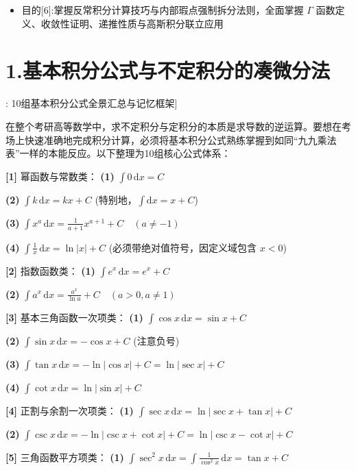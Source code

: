 \documentclass[11pt,a4paper,UTF8]{ctexart}
\begin{document}
\begin{targetbox}[本章复习目标与核心知识图谱]
\begin{itemize}
  \item 目的[6]:掌握反常积分计算技巧与内部瑕点强制拆分法则，全面掌握 $\Gamma$ 函数定义、收敛性证明、递推性质与高斯积分联立应用
\end{itemize}
\end{targetbox}


\section{1.基本积分公式与不定积分的凑微分法}

\begin{thmbox}[公式[1]: 10组基本积分公式全景汇总与记忆框架]

在整个考研高等数学中，求不定积分与定积分的本质是求导数的逆运算。要想在考场上快速准确地完成积分计算，必须将基本积分公式熟练掌握到如同“九九乘法表”一样的本能反应。以下整理为10组核心公式体系：

\textbf{[1]} 幂函数与常数类：
\textbf{(1)}  $\int 0\,\mathrm{d}x = C$

\textbf{(2)}  $\int k\,\mathrm{d}x = kx + C$ (特别地，$\int \mathrm{d}x = x + C$)

\textbf{(3)}  $\int x^a\,\mathrm{d}x = \frac{1}{a+1}x^{a+1} + C \quad (a \neq -1)$

\textbf{(4)}  $\int \frac{1}{x}\,\mathrm{d}x = \ln|x| + C$ (必须带绝对值符号，因定义域包含 $x < 0$)

\textbf{[2]} 指数函数类：
\textbf{(1)}  $\int e^x\,\mathrm{d}x = e^x + C$

\textbf{(2)}  $\int a^x\,\mathrm{d}x = \frac{a^x}{\ln a} + C \quad (a > 0, a \neq 1)$

\textbf{[3]} 基本三角函数一次项类：
\textbf{(1)}  $\int \cos x\,\mathrm{d}x = \sin x + C$

\textbf{(2)}  $\int \sin x\,\mathrm{d}x = -\cos x + C$ (注意负号)

\textbf{(3)}  $\int \tan x\,\mathrm{d}x = -\ln|\cos x| + C = \ln|\sec x| + C$

\textbf{(4)}  $\int \cot x\,\mathrm{d}x = \ln|\sin x| + C$

\textbf{[4]} 正割与余割一次项类：
\textbf{(1)}  $\int \sec x\,\mathrm{d}x = \ln|\sec x + \tan x| + C$

\textbf{(2)}  $\int \csc x\,\mathrm{d}x = -\ln|\csc x + \cot x| + C = \ln|\csc x - \cot x| + C$

\textbf{[5]} 三角函数平方项类：
\textbf{(1)}  $\int \sec^2 x\,\mathrm{d}x = \int \frac{1}{\cos^2 x}\,\mathrm{d}x = \tan x + C$


\end{thmbox}
\end{document}
